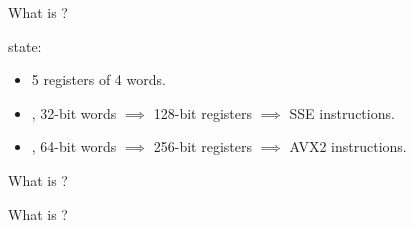 \documentclass[aspectratio=169,9pt]{beamer}
\begin{document}

\begin{frame}{What is \MORUS?}

\MORUS state:
\begin{itemize}
  \item 5 registers of 4 words.
  \item \MORUS[640], 32-bit words $\implies$ 128-bit registers $\implies$ SSE instructions.
  \item \MORUS[1280], 64-bit words $\implies$ 256-bit registers $\implies$ AVX2 instructions.
\end{itemize}
\begin{figure}[h]
  \centering
  \resizebox{0.8\textwidth}{!}{%
  
  }
\end{figure}
\end{frame}


\begin{frame}{What is \MORUS?}

\begin{figure}[h]
  \substatesfalse
  \centering
  \resizebox{0.9\textwidth}{!}{%
  
  }
\end{figure}
\end{frame}


\begin{frame}{What is \MORUS?}

\begin{figure}[h]
  \substatesfalse
  \centering
  \resizebox{!}{0.8\textheight}{%
  
  }
\end{figure}
\end{frame}

\end{document}
